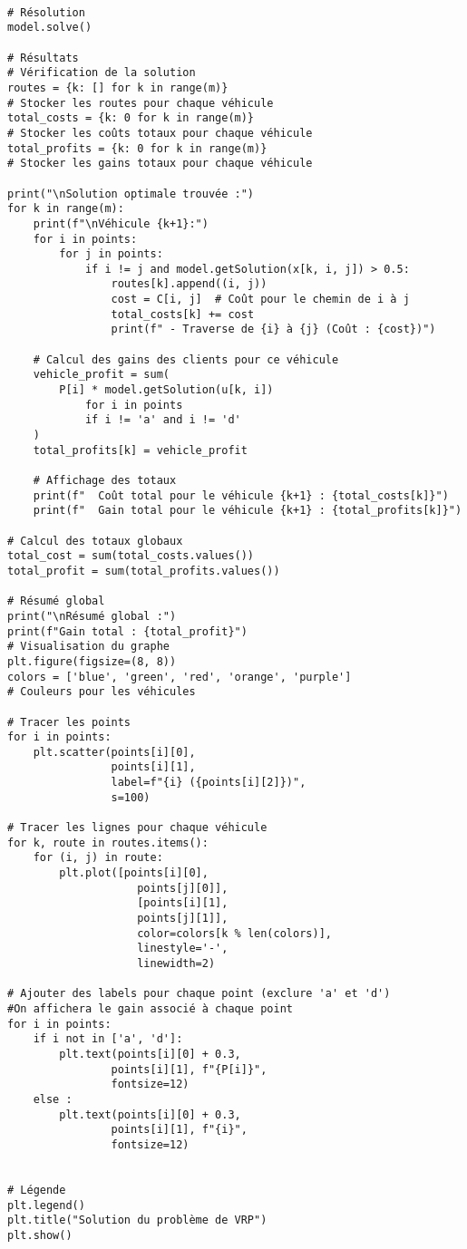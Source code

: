 \documentclass[a4paper, 12pt, DIV=12]{scrartcl}
\begin{document}
\begin{verbatim}

# Résolution
model.solve()

# Résultats
# Vérification de la solution
routes = {k: [] for k in range(m)}  
# Stocker les routes pour chaque véhicule
total_costs = {k: 0 for k in range(m)}  
# Stocker les coûts totaux pour chaque véhicule
total_profits = {k: 0 for k in range(m)}  
# Stocker les gains totaux pour chaque véhicule

print("\nSolution optimale trouvée :")
for k in range(m):
    print(f"\nVéhicule {k+1}:")
    for i in points:
        for j in points:
            if i != j and model.getSolution(x[k, i, j]) > 0.5:
                routes[k].append((i, j))
                cost = C[i, j]  # Coût pour le chemin de i à j
                total_costs[k] += cost
                print(f" - Traverse de {i} à {j} (Coût : {cost})")
    
    # Calcul des gains des clients pour ce véhicule
    vehicle_profit = sum(
        P[i] * model.getSolution(u[k, i]) 
            for i in points 
            if i != 'a' and i != 'd'
    )
    total_profits[k] = vehicle_profit

    # Affichage des totaux
    print(f"  Coût total pour le véhicule {k+1} : {total_costs[k]}")
    print(f"  Gain total pour le véhicule {k+1} : {total_profits[k]}")

# Calcul des totaux globaux
total_cost = sum(total_costs.values())
total_profit = sum(total_profits.values())

# Résumé global
print("\nRésumé global :")
print(f"Gain total : {total_profit}")
# Visualisation du graphe
plt.figure(figsize=(8, 8))
colors = ['blue', 'green', 'red', 'orange', 'purple']  
# Couleurs pour les véhicules

# Tracer les points
for i in points:
    plt.scatter(points[i][0], 
                points[i][1], 
                label=f"{i} ({points[i][2]})",
                s=100)

# Tracer les lignes pour chaque véhicule
for k, route in routes.items():
    for (i, j) in route:
        plt.plot([points[i][0], 
                    points[j][0]], 
                    [points[i][1], 
                    points[j][1]], 
                    color=colors[k % len(colors)], 
                    linestyle='-', 
                    linewidth=2)

# Ajouter des labels pour chaque point (exclure 'a' et 'd') 
#On affichera le gain associé à chaque point
for i in points:
    if i not in ['a', 'd']:
        plt.text(points[i][0] + 0.3, 
                points[i][1], f"{P[i]}", 
                fontsize=12)
    else :
        plt.text(points[i][0] + 0.3, 
                points[i][1], f"{i}", 
                fontsize=12)


# Légende
plt.legend()
plt.title("Solution du problème de VRP")
plt.show()
\end{verbatim}
\end{document}
